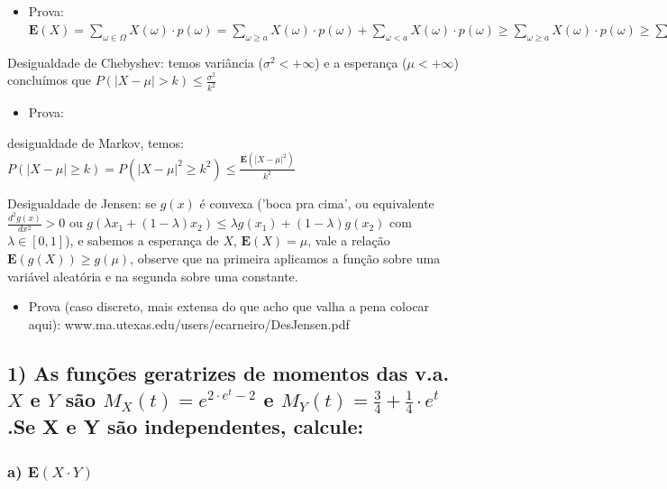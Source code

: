 \documentclass[english]{article}
\newenvironment{lyxlist}[1]
{\begin{list}{}
{\settowidth{\labelwidth}{#1}
 \setlength{\leftmargin}{\labelwidth}
 \addtolength{\leftmargin}{\labelsep}
 \renewcommand{\makelabel}[1]{##1\hfil}}}
{\end{list}}
\begin{document}
\begin{enumerate}
\begin{itemize}
\item Prova: $\mathbf{E}(X)=\sum_{\omega\in\Omega}X(\omega)\cdot p(\omega)=\sum_{\omega\ge a}X(\omega)\cdot p(\omega)+\sum_{\omega<a}X(\omega)\cdot p(\omega)\ge\sum_{\omega\ge a}X(\omega)\cdot p(\omega)\ge\sum_{\omega\ge a}a\cdot p(\omega)=a\cdot\sum_{\omega\ge a}p(\omega)=a\cdot P(X\ge a)\implies\frac{\mathbf{E}(X)}{a}\ge P(X\ge a)$
\end{itemize}
\item Desigualdade de Chebyshev: temos variância ($\sigma^{2}<+\infty$)
e a esperança ($\mu<+\infty$) concluímos que $P(\left|X-\mu\right|>k)\le\frac{\sigma^{2}}{k^{2}}$ 

\begin{itemize}
\item Prova:\end{itemize}
\begin{lyxlist}{00.00.0000}
\item [{Usando}] desigualdade de Markov, temos: $P(\left|X-\mu\right|\ge k)=P(\left|X-\mu\right|^{2}\ge k^{2})\le\frac{\mathbf{E}(\left|X-\mu\right|^{2})}{k^{2}}$
\end{lyxlist}
\item Desigualdade de Jensen: se $g(x)$ é convexa ('boca pra cima', ou
equivalente $\frac{d^{2}g(x)}{dx^{2}}>0$ ou $g(\lambda x_{1}+(1-\lambda)x_{2})\le\lambda g(x_{1})+(1-\lambda)g(x_{2})$
com $\lambda\in[0,1]$), e sabemos a esperança de $X$, $\mathbf{E}(X)=\mu$,
vale a relação $\mathbf{E}(g(X))\ge g(\mu)$, observe que na primeira
aplicamos a função sobre uma variável aleatória e na segunda sobre
uma constante.

\begin{itemize}
\item Prova (caso discreto, mais extensa do que acho que valha a pena colocar
aqui): www.ma.utexas.edu/users/ecarneiro/DesJensen.pdf 
\end{itemize}
\end{enumerate}
\pagebreak{}


\subsection*{\textmd{1) As funções geratrizes de momentos das v.a. $X$ e $Y$
são $M_{X}(t)=e^{2\cdot e^{t}-2}$ e $M_{Y}(t)=\frac{3}{4}+\frac{1}{4}\cdot e^{t}$.Se
X e Y são independentes, calcule:}}


\subsubsection*{\textmd{a) $\mathbf{E}(X\cdot Y)$}}
\end{document}
